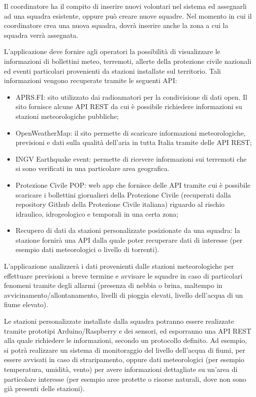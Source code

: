 Il coordinatore ha il compito di inserire nuovi volontari nel sistema ed assegnarli ad una squadra esistente, oppure può creare nuove squadre. Nel momento in cui il coordinatore crea una nuova squadra, dovrà inserire anche la zona a cui la squadra verrà assegnata.

L'applicazione deve fornire agli operatori la possibilità di visualizzare le informazioni di bollettini meteo, terremoti, allerte della protezione civile nazionali ed eventi particolari provenienti da stazioni installate sul territorio. Tali informazioni vengono recuperate tramite le seguenti API: 
\begin{itemize}
	\item APRS.FI: sito utilizzato dai radioamatori per la condivisione di dati open. Il sito fornisce alcune API REST da cui è possibile richiedere informazioni su stazioni meteorologiche pubbliche;
	\item OpenWeatherMap: il sito permette di scaricare informazioni meteorologiche, previsioni e dati sulla qualità dell’aria in tutta Italia tramite delle API REST;
	\item INGV Earthquake event: permette di ricevere informazioni sui terremoti che si sono verificati in una particolare area geografica.
	\item Protezione Civile POP: web app che fornisce delle API tramite cui è possibile scaricare i bollettini giornalieri della Protezione Civile (recuperati dalla repository Github della Protezione Civile italiana) riguardo al rischio idraulico, idrogeologico e temporali in una certa zona;
	\item Recupero di dati da stazioni personalizzate posizionate da una squadra: la stazione fornirà una API dalla quale poter recuperare dati di interesse (per esempio dati meteorologici o livello di torrenti). 
\end{itemize}

L'applicazione analizzerà i dati provenienti dalle stazioni meteorologiche per effettuare previsioni a breve termine e avvisare le squadre in caso di particolari fenomeni tramite degli allarmi (presenza di nebbia o brina, maltempo in avvicinamento/allontanamento, livelli di pioggia elevati, livello dell'acqua di un fiume elevato).

Le stazioni personalizzate installate dalla squadra potranno essere realizzate tramite prototipi Arduino/Raspberry e dei sensori, ed esporranno una API REST alla quale richiedere le informazioni, secondo un protocollo definito. Ad esempio, si potrà realizzare un sistema di monitoraggio del livello dell’acqua di fiumi, per essere avvisati in caso di straripamento, oppure dati meteorologici (per esempio temperatura, umidità, vento) per avere informazioni dettagliate su un’area di particolare interesse (per esempio aree protette o risorse naturali, dove non sono già presenti delle stazioni). 

